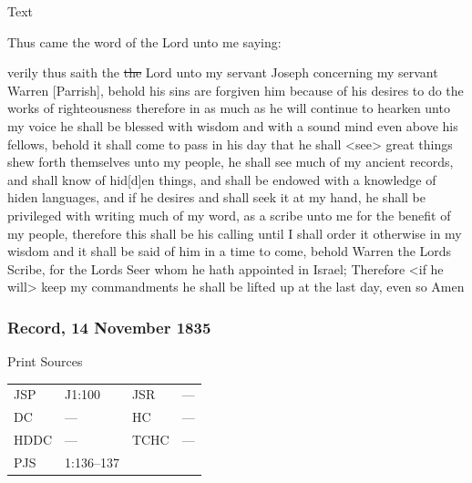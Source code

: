 			
			\begin{description}
				\item[Text]
			\end{description}
			
				Thus came the word of the Lord unto me saying:
				
				verily thus saith the \sout{the} Lord unto my servant Joseph concerning my servant Warren [Parrish], behold his sins are forgiven him because of his desires to do the works of righteousness therefore in as much as he will continue to hearken unto my voice he shall be blessed with wisdom and with a sound mind even above his fellows, behold it shall come to pass in his day that he shall <see> great things shew forth themselves unto my people, he shall see much of my ancient records, and shall know of hid[d]en things, and shall be endowed with a knowledge of hiden languages, and if he desires and shall seek it at my hand, he shall be privileged with writing much of my word, as a scribe unto me for the benefit of my people, therefore this shall be his calling until I shall order it otherwise in my wisdom and it shall be said of him in a time to come, behold Warren the Lords Scribe, for the Lords Seer whom he hath appointed in Israel; Therefore <if he will> keep my commandments he shall be lifted up at the last day, even so Amen
				
		\subsubsection{Record, 14 November 1835}
			\label{EMS-1835-JS-14-NOV-1835-REC}
			
			\begin{description}
				\item[Print Sources]
			\end{description}

				\begin{tabular}{p{0.5in}p{1in}p{0.5in}p{1in}}
				JSP	 	& J1:100		& JSR 		& --- \\
				DC	 	& --- 			& HC 		& --- \\
				HDDC 	& ---			& TCHC 		& --- \\
				PJS 	& 1:136--137			& 	 		&  \\
				\end{tabular}
			
